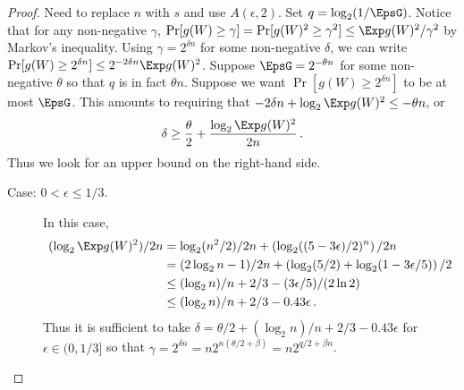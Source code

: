 \begin{proof}
  {\color{red} Need to replace $n$ with $s$ and use $A(\epsilon, 2)$.}
  Set $q = \log_2(1/\EpsG)$.
  Notice that for any non-negative $\gamma$, 
  $\Pr[g(W) \geq \gamma ] = \Pr[g(W)^2 \geq \gamma^2 ] \leq \Exp g(W)^2/\gamma^2$ 
  by Markov's inequality. 
  Using $\gamma = 2^{\delta n}$ for some non-negative $\delta$, we can write 
  $\Pr[g(W) \geq 2^{\delta n}] \leq 2^{-2\delta n} \Exp g(W)^2$. 
  Suppose $\EpsG = 2^{-\theta n}$ for some non-negative $\theta$ 
  so that $q$ is in fact $\theta n$.  
  Suppose we want $\Pr[g(W) \geq 2^{\delta n}]$ to be at most $\EpsG$. 
  This amounts to requiring that 
  $-2\delta n + \log_2 \Exp g(W)^2 \leq -\theta n$, or 
  \[
      \delta \geq \frac{\theta}{2} + \frac{\log_2 \Exp g(W)^2}{2n}
      \,.
  \]
  Thus we look for an upper bound on the right-hand side. 

  \begin{description}

    \item[Case: $0 < \epsilon \leq 1/3$.]
    In this case,
    \begin{align*}
        (\log_2 \Exp g(W)^2)/2n
        &= \log_2(n^2/2)/2n + \left(\log_2((5-3\epsilon)/2)^n\right)/2n \\
        &= (2\log_2 n - 1)/2n + \left( \log_2(5/2) + \log_2(1 - 3\epsilon/5) \right)/2 \\
        &\leq (\log_2 n)/n + 2/3 - (3\epsilon/5)/(2\ln 2) \\
        &\leq (\log_2 n)/n + 2/3 - 0.43 \epsilon
        \,.
    \end{align*}
    Thus it is sufficient to take 
    $
        \delta = \theta/2 + (\log_2 n)/n  + 2/3 - 0.43 \epsilon
    $
    for $\epsilon \in (0, 1/3]$ 
    so that $\gamma = 2^{\delta n} = n 2^{n(\theta/2 + \beta)} = n 2^{q/2 + \beta n}$.


\end{description}
\end{proof}
